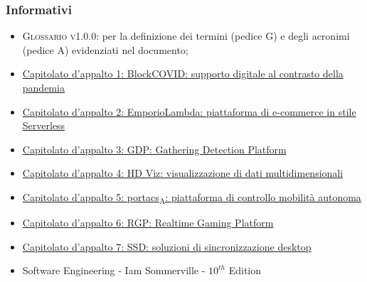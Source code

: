 \subsubsection{Informativi}
\begin{itemize}
	\item \textsc{Glossario v1.0.0}: per la definizione dei termini (pedice G) e degli acronimi (pedice A) evidenziati nel documento;
	\item \href{https://www.math.unipd.it/~tullio/IS-1/2020/Progetto/C1.pdf}{Capitolato d'appalto 1: BlockCOVID: supporto digitale al contrasto della pandemia}\\
	\item \href{https://www.math.unipd.it/~tullio/IS-1/2020/Progetto/C2.pdf}{Capitolato d'appalto 2: EmporioLambda: piattaforma di e-commerce in stile Serverless}\\
	\item \href{https://www.math.unipd.it/~tullio/IS-1/2020/Progetto/C3.pdf}{Capitolato d'appalto 3: GDP: Gathering Detection Platform}\\
	\item \href{https://www.math.unipd.it/~tullio/IS-1/2020/Progetto/C4.pdf}{Capitolato d'appalto 4: HD Viz: visualizzazione di dati multidimensionali}\\
	\item \href{https://www.math.unipd.it/~tullio/IS-1/2020/Progetto/C5.pdf}{Capitolato d'appalto 5: \acrshort{portacs}\textsubscript{A}: piattaforma di controllo mobilità autonoma}\\
    \item \href{https://sesaspa-my.sharepoint.com/:b:/g/personal/s_dindo_vargroup_it/EThvay0f6KVCoXydYOce2lkBt-MYcnW1yafRXFXVIOIsHg?e=2emZZI}{Capitolato d'appalto 6: RGP: Realtime Gaming Platform}\\
	\item \href{https://www.math.unipd.it/~tullio/IS-1/2020/Progetto/C7.pdf}{Capitolato d'appalto 7: SSD: soluzioni di sincronizzazione desktop}\\
	\item Software Engineering - Iam Sommerville - $10^{th}$ Edition
\end{itemize}